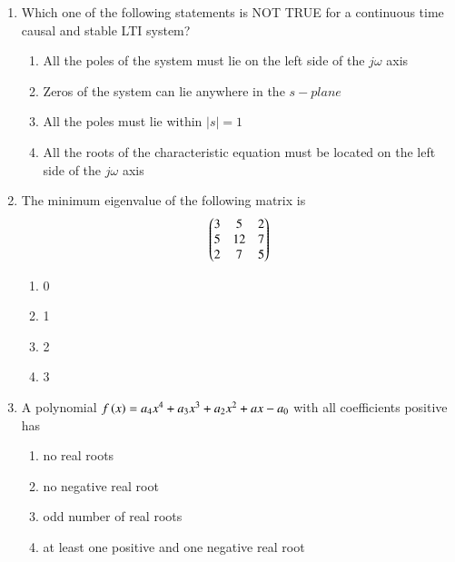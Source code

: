 \documentclass[journal,12pt,onecolumn]{IEEEtran}
\theoremstyle{remark}
\begin{document}
\begin{enumerate}
\item Which one of the following statements is NOT TRUE for a continuous time causal and stable LTI system?
\begin{enumerate}
\item All the poles of the system must lie on the left side of the $j\omega$ axis
\item Zeros of the system can lie anywhere in the $s-plane$
\item All the poles must lie within $|s| = 1$
\item All the roots of the characteristic equation must be located on the left side of the $j\omega$ axis
\end{enumerate}
\hfill {}

\item The minimum eigenvalue of the following matrix is  
\begin{align*}
    \begin{pmatrix} 3 & 5 & 2 \\ 5 & 12 & 7 \\ 2 & 7 & 5 \end{pmatrix}
\end{align*}

\begin{multicols}{4}
  \begin{enumerate}
\item 0
\item 1
\item 2
\item 3
\end{enumerate}
\end{multicols}
\hfill {}

\item A polynomial $f\left(x\right) = a_4x^4 + a_3x^3 + a_2x^2 + ax - a_0$ with all coefficients positive has
\begin{multicols}{2}
\begin{enumerate}
\item no real roots
\item no negative real root
\item odd number of real roots
\item at least one positive and one negative real root
\end{enumerate}
\end{multicols}
\hfill {}


\end{enumerate}
\end{document}
